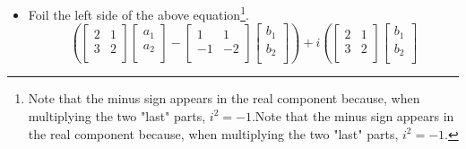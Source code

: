 \documentclass{article}
\begin{document}
\begin{itemize}
\begin{align*}
{        \right)}_x &= \underbrace{\left(
            \begin{bmatrix}
                3\\
                7\\
            \end{bmatrix}
            +i
            \begin{bmatrix}
                6\\
                -1\\
            \end{bmatrix}
        \right)}_b
    \end{align*}
    \item Foil the left side of the above equation\footnote{Note that the minus sign appears in the real component because, when multiplying the two "last" parts, $i^2=-1$.Note that the minus sign appears in the real component because, when multiplying the two "last" parts, $i^2=-1$.}.
    \begin{equation*}
        \left(
            \begin{bmatrix}
                2 & 1\\
                3 & 2\\
            \end{bmatrix}
            \begin{bmatrix}
                a_1\\
                a_2\\
            \end{bmatrix}
            -
            \begin{bmatrix}
                1 & 1\\
                -1 & -2\\
            \end{bmatrix}
            \begin{bmatrix}
                b_1\\
                b_2\\
            \end{bmatrix}
        \right)+i\left(
            \begin{bmatrix}
                2 & 1\\
                3 & 2\\
            \end{bmatrix}
            \begin{bmatrix}
                b_1\\
                b_2\\
            \end{bmatrix}

\end{equation*}
\end{itemize}
\end{document}
